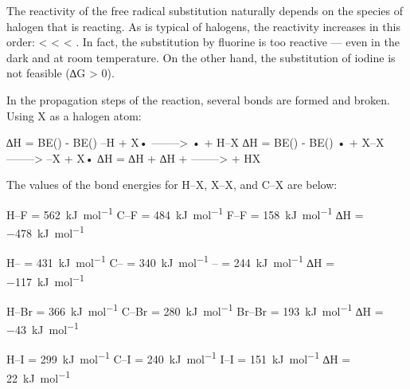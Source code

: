 				The reactivity of the free radical substitution naturally depends on the species of halogen that is reacting.
				As is typical of halogens, the reactivity increases in this order:  <  <  < .
				In fact, the substitution by fluorine is too reactive --- even in the dark and at room temperature. On the other hand,
				the substitution of iodine is not feasible (∆G > 0).

				In the propagation steps of the reaction, several bonds are formed and broken. Using X as a halogen atom:

				\vspace{1em}
				\vbox{∆H = BE() - BE()		\tabto{60mm}–H + X•		\tabto{85mm} ------–> • + H–X	}
				\vbox{∆H = BE() - BE()		\tabto{60mm}• + X–X		\tabto{85mm} ------–> –X + X•	}
				\vbox{∆H = ∆H + ∆H	\tabto{60mm} + 	\tabto{85mm} ------–>  + HX	}

				The values of the bond energies for H–X, X–X, and C–X are below:
				\vspace{1.0em}

				\vbox{
							\tabto{25mm}	H–F			\tabto{50mm} = \SI{562}{\kilo\joule\per\mole}
								\tabto{25mm}	C–F			\tabto{50mm} = \SI{484}{\kilo\joule\per\mole}
								\tabto{25mm}	F–F			\tabto{50mm} = \SI{158}{\kilo\joule\per\mole}
								\tabto{25mm}	∆H	\tabto{50mm} = \SI{-478}{\kilo\joule\per\mole}
				}

				\vspace{1.0em}
				\vbox{
						\tabto{25mm}	H–\ch{\Cl}				\tabto{50mm} = \SI{431}{\kilo\joule\per\mole}
									\tabto{25mm}	C–\ch{\Cl}				\tabto{50mm} = \SI{340}{\kilo\joule\per\mole}
									\tabto{25mm}	\ch{\Cl}–	\tabto{50mm} = \SI{244}{\kilo\joule\per\mole}
									\tabto{25mm}	∆H						\tabto{50mm} = \SI{-117}{\kilo\joule\per\mole}
				}

				\vspace{1.0em}
				\vbox{
						\tabto{25mm}	H–Br		\tabto{50mm} = \SI{366}{\kilo\joule\per\mole}
								\tabto{25mm}	C–Br		\tabto{50mm} = \SI{280}{\kilo\joule\per\mole}
								\tabto{25mm}	Br–Br		\tabto{50mm} = \SI{193}{\kilo\joule\per\mole}
								\tabto{25mm}	∆H	\tabto{50mm} = \SI{-43}{\kilo\joule\per\mole}
				}

				\vspace{1.0em}
				\vbox{
							\tabto{25mm}	H–I			\tabto{50mm} = \SI{299}{\kilo\joule\per\mole}
								\tabto{25mm}	C–I			\tabto{50mm} = \SI{240}{\kilo\joule\per\mole}
								\tabto{25mm}	I–I			\tabto{50mm} = \SI{151}{\kilo\joule\per\mole}
								\tabto{25mm}	∆H	\tabto{50mm} = \SI[retain-explicit-plus]{+22}{\kilo\joule\per\mole}
				}

